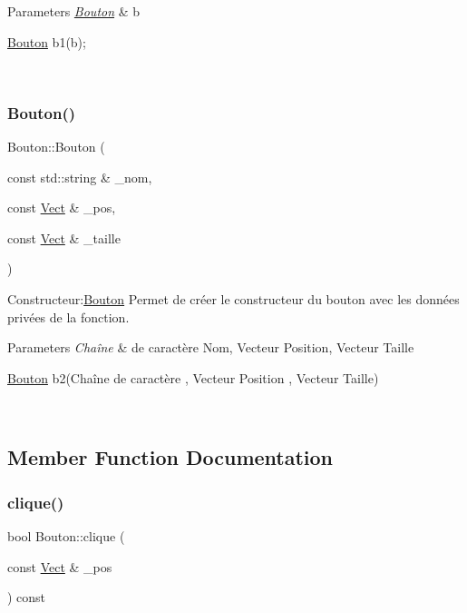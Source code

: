 \begin{DoxyParams}{Parameters}
{\em \hyperlink{classBouton}{Bouton}} & b 
\begin{DoxyCode}
\hyperlink{classBouton}{Bouton} b1(b);
\end{DoxyCode}
 \\
\hline
\end{DoxyParams}
\mbox{\label{classBouton_aeb26a7a212241ab7ce4de225e72c856d}} 
\subsubsection{\texorpdfstring{Bouton()}{Bouton()}\hspace{0.1cm}{\footnotesize\ttfamily [3/3]}}
{\footnotesize\ttfamily Bouton\+::\+Bouton (\begin{DoxyParamCaption}\item[{const std\+::string \&}]{\+\_\+nom,  }\item[{const \hyperlink{classVect}{Vect} \&}]{\+\_\+pos,  }\item[{const \hyperlink{classVect}{Vect} \&}]{\+\_\+taille }\end{DoxyParamCaption})}



Constructeur\+:\hyperlink{classBouton}{Bouton} Permet de créer le constructeur du bouton avec les données privées de la fonction. 


\begin{DoxyParams}{Parameters}
{\em Chaîne} & de caractère Nom, Vecteur Position, Vecteur Taille 
\begin{DoxyCode}
\hyperlink{classBouton}{Bouton} b2(Chaîne de caractère , Vecteur Position , Vecteur Taille)
\end{DoxyCode}
 \\
\hline
\end{DoxyParams}


\subsection{Member Function Documentation}
\mbox{\label{classBouton_aaeefb86ea06be1a11c7098e939374e42}} 
\subsubsection{\texorpdfstring{clique()}{clique()}}
{\footnotesize\ttfamily bool Bouton\+::clique (\begin{DoxyParamCaption}\item[{const \hyperlink{classVect}{Vect} \&}]{\+\_\+pos }\end{DoxyParamCaption}) const}



